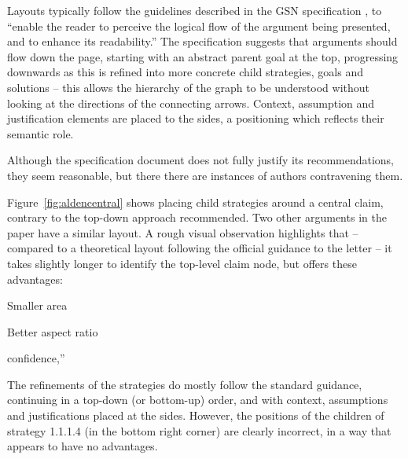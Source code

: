 \begin{itemize*}
Layouts typically follow the guidelines described in the GSN specification \citep[section~2.2, pp.~26--27]{gsnstandard}, 
to ``enable the reader to perceive the logical flow of the argument being presented, and to enhance its readability.''
The specification suggests that arguments should flow down the page, starting with an abstract parent goal at the top, progressing downwards as this is refined into more concrete child strategies, goals and solutions -- this allows the hierarchy of the graph to be understood without looking at the directions of the connecting arrows.
Context, assumption and justification elements are placed to the sides, a positioning which reflects their semantic role.

Although the specification document does not fully justify its recommendations, they seem reasonable, but there there are instances of authors contravening them.

Figure~\ref{fig:aldencentral} shows \citet{royal} placing child strategies around a central claim, contrary to the top-down approach recommended. Two other arguments in the paper \cite[pp.~8--9]{royal} have a similar layout.
A rough visual observation highlights that -- compared to a theoretical layout following the official guidance to the letter -- it takes slightly longer to identify the top-level claim node, but offers these advantages:

\begin{itemize*}
\item Smaller area
\item Better aspect ratio
\item 
\end{itemize*}confidence,”

The refinements of the strategies do mostly follow the standard guidance, continuing in a top-down (or bottom-up) order, and with context, assumptions and justifications placed at the sides. However, the positions of the children of strategy 1.1.1.4 (in the bottom right corner) are clearly incorrect, in a way that appears to have no advantages.


\end{itemize*}
